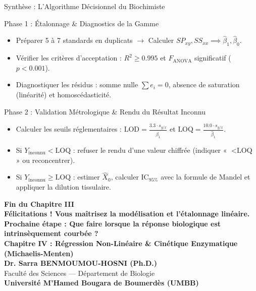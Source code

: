 \documentclass[aspectratio=169,10pt]{beamer}
\begin{document}
\begin{frame}{Synthèse : L'Algorithme Décisionnel du Biochimiste}
  \begin{conceptbox}{Phase 1 : Étalonnage \& Diagnostics de la Gamme}
    \footnotesize
    \begin{itemize}
      \item Préparer 5 à 7 standards en duplicats $\longrightarrow$ Calculer $SP_{xy}, SS_{xx} \implies \hat{\beta}_1, \hat{\beta}_0$.
      \item Vérifier les critères d'acceptation : $R^2 \ge 0.995$ et $F_{\text{ANOVA}}$ significatif ($p < 0.001$).
      \item Diagnostiquer les résidus : somme nulle $\sum e_i = 0$, absence de saturation (linéarité) et homoscédasticité.
    \end{itemize}
  \end{conceptbox}
  \vspace{1mm}
  \begin{biobox}{Phase 2 : Validation Métrologique \& Rendu du Résultat Inconnu}
    \footnotesize
    \begin{itemize}
      \item Calculer les seuils réglementaires : $\text{LOD} = \frac{3.3 \cdot s_{y/x}}{\hat{\beta}_1}$ et $\text{LOQ} = \frac{10.0 \cdot s_{y/x}}{\hat{\beta}_1}$.
      \item Si $Y_{\text{inconnu}} < \text{LOQ}$ : refuser le rendu d'une valeur chiffrée (indiquer « $< \text{LOQ}$ » ou reconcentrer).
      \item Si $Y_{\text{inconnu}} \ge \text{LOQ}$ : estimer $\hat{X}_0$, calculer $\text{IC}_{95\%}$ avec la formule de Mandel et appliquer la dilution tissulaire.
    \end{itemize}
  \end{biobox}
\end{frame}

\begin{frame}[plain]
  \begin{center}
    \vspace{1.5cm}
    {\Huge\color{BioNavy}\textbf{Fin du Chapitre III}}\\[0.6cm]
    {\large\color{BioTeal}\textbf{Félicitations ! Vous maîtrisez la modélisation et l'étalonnage linéaire.}}\\[1.0cm]
    {\normalsize\textbf{Prochaine étape : Que faire lorsque la réponse biologique est intrinsèquement courbée ?}}\\[0.3cm]
    {\large\textbf{Chapitre IV : Régression Non-Linéaire \& Cinétique Enzymatique (Michaelis-Menten)}}\\[1.2cm]
    \textbf{Dr. Sarra BENMOUMOU-HOSNI (Ph.D.)}\\
    \small Faculté des Sciences --- Département de Biologie\\
    \textbf{Université M'Hamed Bougara de Boumerdès (UMBB)}
  \end{center}
\end{frame}
\end{document}
